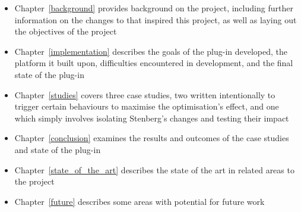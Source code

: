 \begin{itemize}
	\item{Chapter~\ref{background} provides background on the project, including further information on the changes to  that inspired this project, as well as laying out the objectives of the project}
	\item{Chapter~\ref{implementation} describes the goals of the plug-in developed, the platform it built upon, difficulties encountered in development, and the final state of the plug-in}
	\item{Chapter~\ref{studies} covers three case studies, two written intentionally to trigger certain behaviours to maximise the optimisation's effect, and one which simply involves isolating Stenberg's changes and testing their impact}
	\item{Chapter~\ref{conclusion} examines the results and outcomes of the case studies and state of the plug-in}
	\item{Chapter~\ref{state_of_the_art} describes the state of the art in related areas to the project}
	\item{Chapter~\ref{future} describes some areas with potential for future work}
\end{itemize}
